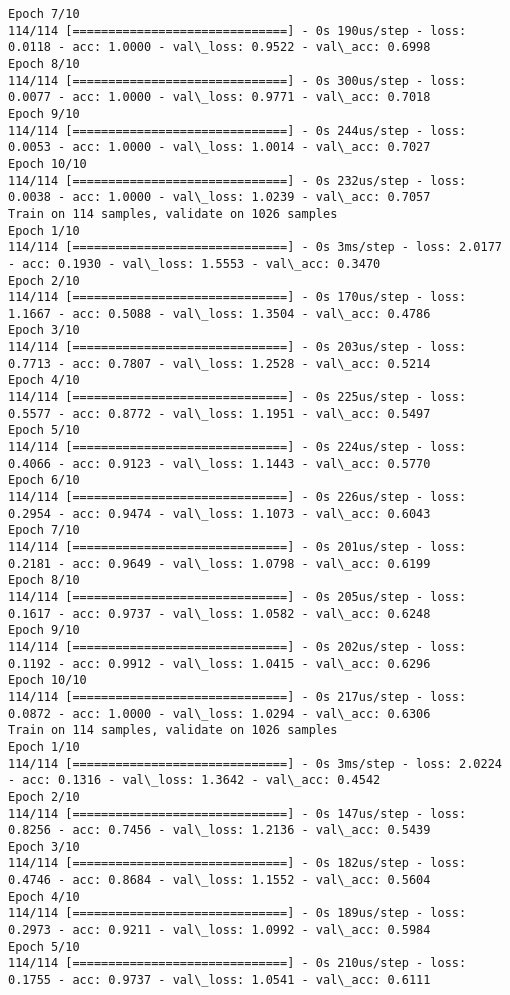 \documentclass[11pt]{article}
\begin{document}
\begin{Verbatim}[commandchars=\\\{\}]
Epoch 7/10
114/114 [==============================] - 0s 190us/step - loss: 0.0118 - acc: 1.0000 - val\_loss: 0.9522 - val\_acc: 0.6998
Epoch 8/10
114/114 [==============================] - 0s 300us/step - loss: 0.0077 - acc: 1.0000 - val\_loss: 0.9771 - val\_acc: 0.7018
Epoch 9/10
114/114 [==============================] - 0s 244us/step - loss: 0.0053 - acc: 1.0000 - val\_loss: 1.0014 - val\_acc: 0.7027
Epoch 10/10
114/114 [==============================] - 0s 232us/step - loss: 0.0038 - acc: 1.0000 - val\_loss: 1.0239 - val\_acc: 0.7057
Train on 114 samples, validate on 1026 samples
Epoch 1/10
114/114 [==============================] - 0s 3ms/step - loss: 2.0177 - acc: 0.1930 - val\_loss: 1.5553 - val\_acc: 0.3470
Epoch 2/10
114/114 [==============================] - 0s 170us/step - loss: 1.1667 - acc: 0.5088 - val\_loss: 1.3504 - val\_acc: 0.4786
Epoch 3/10
114/114 [==============================] - 0s 203us/step - loss: 0.7713 - acc: 0.7807 - val\_loss: 1.2528 - val\_acc: 0.5214
Epoch 4/10
114/114 [==============================] - 0s 225us/step - loss: 0.5577 - acc: 0.8772 - val\_loss: 1.1951 - val\_acc: 0.5497
Epoch 5/10
114/114 [==============================] - 0s 224us/step - loss: 0.4066 - acc: 0.9123 - val\_loss: 1.1443 - val\_acc: 0.5770
Epoch 6/10
114/114 [==============================] - 0s 226us/step - loss: 0.2954 - acc: 0.9474 - val\_loss: 1.1073 - val\_acc: 0.6043
Epoch 7/10
114/114 [==============================] - 0s 201us/step - loss: 0.2181 - acc: 0.9649 - val\_loss: 1.0798 - val\_acc: 0.6199
Epoch 8/10
114/114 [==============================] - 0s 205us/step - loss: 0.1617 - acc: 0.9737 - val\_loss: 1.0582 - val\_acc: 0.6248
Epoch 9/10
114/114 [==============================] - 0s 202us/step - loss: 0.1192 - acc: 0.9912 - val\_loss: 1.0415 - val\_acc: 0.6296
Epoch 10/10
114/114 [==============================] - 0s 217us/step - loss: 0.0872 - acc: 1.0000 - val\_loss: 1.0294 - val\_acc: 0.6306
Train on 114 samples, validate on 1026 samples
Epoch 1/10
114/114 [==============================] - 0s 3ms/step - loss: 2.0224 - acc: 0.1316 - val\_loss: 1.3642 - val\_acc: 0.4542
Epoch 2/10
114/114 [==============================] - 0s 147us/step - loss: 0.8256 - acc: 0.7456 - val\_loss: 1.2136 - val\_acc: 0.5439
Epoch 3/10
114/114 [==============================] - 0s 182us/step - loss: 0.4746 - acc: 0.8684 - val\_loss: 1.1552 - val\_acc: 0.5604
Epoch 4/10
114/114 [==============================] - 0s 189us/step - loss: 0.2973 - acc: 0.9211 - val\_loss: 1.0992 - val\_acc: 0.5984
Epoch 5/10
114/114 [==============================] - 0s 210us/step - loss: 0.1755 - acc: 0.9737 - val\_loss: 1.0541 - val\_acc: 0.6111

\end{Verbatim}
\end{document}
